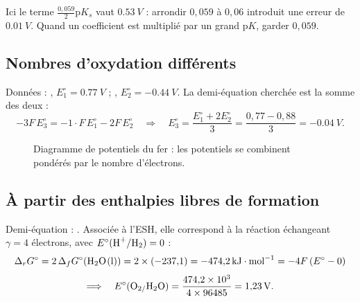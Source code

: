 \begin{pieges}
Ici le terme $\frac{0{,}059}{2}\mathrm{p}K_s$ vaut $\SI{0,53}{V}$ : arrondir $0{,}059$ à $0{,}06$ introduit une erreur de $\SI{0,01}{V}$. Quand un coefficient est multiplié par un grand $\mathrm{p}K$, garder $0{,}059$.
\end{pieges}

\subsection{Nombres d'oxydation différents}

\begin{exemple}[$E^\circ(\ce{Fe^{3+}}/\ce{Fe})$]
Données : , $E_1^\circ = \SI{0,77}{V}$ ; , $E_2^\circ = \SI{-0,44}{V}$. La demi-équation cherchée  est la somme des deux :
\[ -3F\,E_3^\circ = -1\cdot F\,E_1^\circ - 2F\,E_2^\circ \quad\Longrightarrow\quad E_3^\circ = \frac{E_1^\circ + 2E_2^\circ}{3} = \frac{0{,}77 - 0{,}88}{3} = \SI{-0,04}{V}. \]
\end{exemple}

\begin{figure}[H]
\centering
{}
\caption{Diagramme de potentiels du fer : les potentiels se combinent pondérés par le nombre d'électrons.}
\label{fig:latimer}
\end{figure}

\subsection{À partir des enthalpies libres de formation}

\begin{exemple}[$E^\circ(\ce{O2}/\ce{H2O})$]
Demi-équation : . Associée à l'ESH, elle correspond à la réaction  échangeant $\gamma = 4$ électrons, avec $E^\circ(\ce{H+/H2}) = 0$ :
\[ \Delta_rG^\circ = 2\,\Delta_fG^\circ(\ce{H2O(l)}) = 2\times(-237{,}1) = \SI{-474,2}{kJ.mol^{-1}} = -4F\,(E^\circ - 0) \]
\[ \Longrightarrow\quad E^\circ(\ce{O2/H2O}) = \frac{474{,}2\times10^3}{4\times96485} = \SI{1,23}{V}. \]
\end{exemple}
